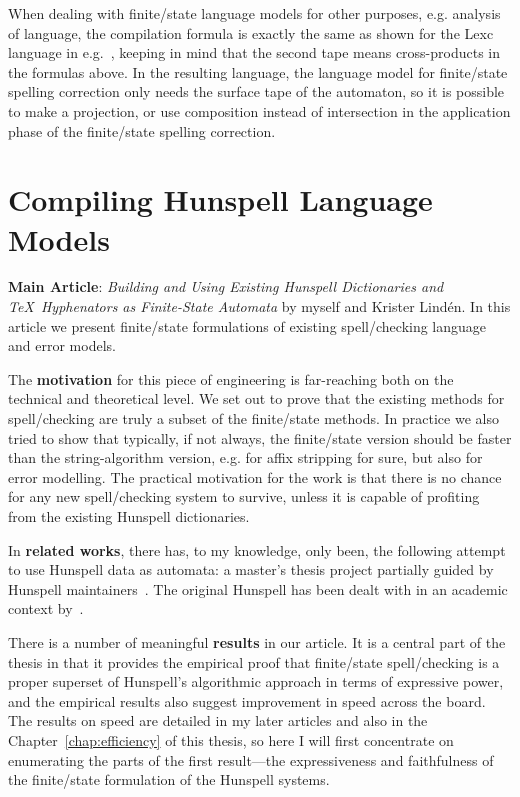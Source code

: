 \documentclass[officiallayout]{unihelcompling}
\begin{document}
When dealing with finite\-/state language models for other purposes, e.g.
analysis of language, the compilation formula is exactly the same as shown for
the Lexc language in e.g.~\citet{linden2009hfst}, keeping in mind that the
second tape means cross-products in the formulas above. In the resulting
language, the language model for finite\-/state spelling correction only needs
the surface tape of the automaton, so it is possible to make a projection, or
use composition instead of intersection in the application phase of the
finite\-/state spelling correction.

\section{Compiling Hunspell Language Models}
\label{sec:Hunspell}

\textbf{Main Article}: \emph{Building and Using Existing Hunspell Dictionaries
and \TeX\ Hyphenators as Finite-State Automata} by myself and Krister Lindén.
In this article we present finite\-/state formulations of existing spell\-/checking
language and error models.

The \textbf{motivation} for this piece of engineering is far-reaching both on
the technical and theoretical level. We set out to prove that the existing
methods for spell\-/checking are truly a subset of the finite\-/state methods.
In practice we also tried to show that typically, if not always, the
finite\-/state version should be faster than the string-algorithm version, e.g. for
affix stripping for sure, but also for error modelling. The practical
motivation for the work is that there is no chance for any new spell\-/checking
system to survive, unless it is capable of profiting from the existing Hunspell
dictionaries.

In \textbf{related works}, there has, to my knowledge, only been, the following
attempt to use Hunspell data as automata: a master's thesis project partially
guided by Hunspell maintainers~\citep{greenfield2010open}.
The
original Hunspell has been dealt with in an academic context 
by~\citet{tron2005hunmorph}.

There is a number of meaningful \textbf{results} in our article. It
is a central part of the thesis in that it provides the empirical proof that
finite\-/state spell\-/checking is a proper superset of Hunspell's algorithmic 
approach in terms of expressive power, and the empirical results also suggest
improvement in speed across the board. The results on speed are detailed in my
later articles and also in the Chapter~\ref{chap:efficiency} of this thesis,
so here I will first concentrate on enumerating the parts of the first
result---the expressiveness and faithfulness of the finite\-/state formulation of
the Hunspell systems.
\end{document}
